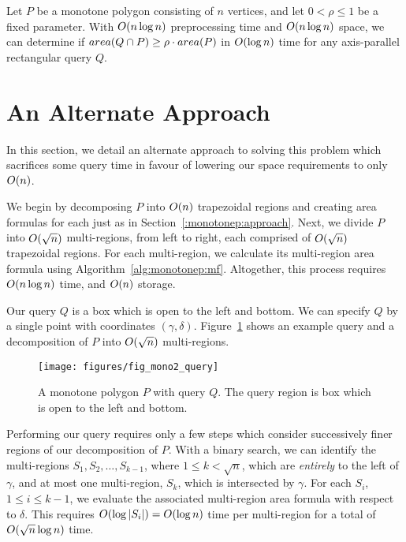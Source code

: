 \begin{corollary}
\label{cor:monotonep:rect:mp}
Let $P$ be a monotone polygon consisting of $n$ vertices, and let $0 < \rho \leq 1$ be a fixed parameter.
With $O\!\left(n \log{n}\right)$ preprocessing time and $O\!\left(n \log{n}\right)$ space, we can determine if $area(Q \cap P) \geq \rho \cdot area(P)$ in $O\!\left(\log{n}\right)$ time for any axis-parallel rectangular query $Q$.
\end{corollary}


\section{An Alternate Approach}
\label{:monotonep:alt}

In this section, we detail an alternate approach to solving this problem which sacrifices some query time in favour of lowering our space requirements to only $O\!\left(n\right)$.

We begin by decomposing $P$ into $O\!\left(n\right)$ trapezoidal regions and creating area formulas for each just as in Section~\ref{:monotonep:approach}. 
Next, we divide $P$ into $O\!\left(\sqrt{n}\right)$ multi-regions, from left to right, each comprised of $O\!\left(\sqrt{n}\right)$ trapezoidal regions.
For each multi-region, we calculate its multi-region area formula using Algorithm~\ref{alg:monotonep:mf}.  
Altogether, this process requires $O\!\left(n\log{n}\right)$ time, and $O\!\left(n\right)$ storage.

Our query $Q$ is a box which is open to the left and bottom.
We can specify $Q$ by a single point with coordinates $(\gamma, \delta)$.  
Figure~\ref{fig:mono2:query} shows an example query and a decomposition of $P$ into $O\!\left(\sqrt{n}\right)$ multi-regions.

\begin{figure}[t]
\begin{center}
  \texttt{[image: figures/fig\_mono2\_query]}
  \caption[An alternate query method for a monotone polygon.]{A monotone polygon $P$ with query $Q$. The query region is box which is open to the left and bottom.}
  \label{fig:mono2:query}
\end{center}
\end{figure}

Performing our query requires only a few steps which consider successively finer regions of our decomposition of $P$.
With a binary search, we can identify the multi-regions $S_1, S_2, \ldots, S_{k-1}$, where $1 \leq k < \sqrt{n}$, which are \emph{entirely} to the left of $\gamma$, and at most one multi-region, $S_{k}$, which is intersected by $\gamma$.  
For each $S_i$, $1 \leq i \leq k-1$, we evaluate the associated multi-region area formula with respect to $\delta$. 
This requires $O\!\left(\log{|S_i|}\right) = O\!\left(\log{n}\right)$ time per multi-region for a total of $O\!\left(\sqrt{n}\log{n}\right)$ time.

